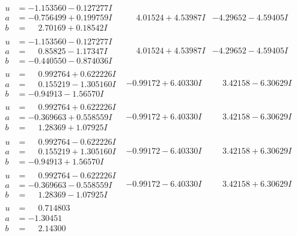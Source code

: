 \documentclass[1p]{elsarticle_modified}
\theoremstyle{definition}
\begin{document}
$$\begin{array}{c|c|c}
\begin{aligned}
u &= -1.153560 - 0.127277 I \\
a &= -0.756499 + 0.199759 I \\
b &= \phantom{-}2.70169 + 0.18542 I\end{aligned}
 & \phantom{-}4.01524 + 4.53987 I & -4.29652 - 4.59405 I \\ \hline\begin{aligned}
u &= -1.153560 - 0.127277 I \\
a &= \phantom{-}0.85825 - 1.17347 I \\
b &= -0.440550 - 0.874036 I\end{aligned}
 & \phantom{-}4.01524 + 4.53987 I & -4.29652 - 4.59405 I \\ \hline\begin{aligned}
u &= \phantom{-}0.992764 + 0.622226 I \\
a &= \phantom{-}0.155219 - 1.305160 I \\
b &= -0.94913 - 1.56570 I\end{aligned}
 & -0.99172 + 6.40330 I & \phantom{-}3.42158 - 6.30629 I \\ \hline\begin{aligned}
u &= \phantom{-}0.992764 + 0.622226 I \\
a &= -0.369663 + 0.558559 I \\
b &= \phantom{-}1.28369 + 1.07925 I\end{aligned}
 & -0.99172 + 6.40330 I & \phantom{-}3.42158 - 6.30629 I \\ \hline\begin{aligned}
u &= \phantom{-}0.992764 - 0.622226 I \\
a &= \phantom{-}0.155219 + 1.305160 I \\
b &= -0.94913 + 1.56570 I\end{aligned}
 & -0.99172 - 6.40330 I & \phantom{-}3.42158 + 6.30629 I \\ \hline\begin{aligned}
u &= \phantom{-}0.992764 - 0.622226 I \\
a &= -0.369663 - 0.558559 I \\
b &= \phantom{-}1.28369 - 1.07925 I\end{aligned}
 & -0.99172 - 6.40330 I & \phantom{-}3.42158 + 6.30629 I \\ \hline\begin{aligned}
u &= \phantom{-}0.714803\phantom{ +0.000000I} \\
a &= -1.30451\phantom{ +0.000000I} \\
b &= \phantom{-}2.14300\phantom{ +0.000000I}\end{aligned}

\end{array}$$
\end{document}

